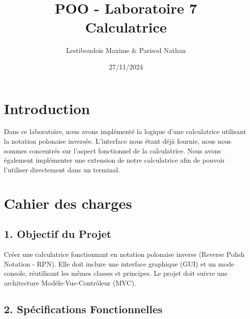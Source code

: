 \documentclass[12pt]{report}
\title{POO - Laboratoire 7 \\ \large Calculatrice}
\author{Lestiboudois Maxime \& Parisod Nathan}
\date{27/11/2024}
\begin{document}
    \maketitle
    \tableofcontents
    \newpage


    \section*{Introduction}
    Dans ce laboratoire, nous avons implémenté la logique d'une calculatrice utilisant la notation polonaise inversée.
    L'interface nous étant déjà fournie, nous nous sommes concentrés sur l'aspect fonctionnel de la calculatrice.
    \newline Nous avons également implémenter une extension de notre calculatrice afin de pouvoir l'utiliser directement
    dans un terminal.
    \section*{Cahier des charges}
        \subsection*{1. Objectif du Projet}
        Créer une calculatrice fonctionnant en notation polonaise inverse (Reverse Polish Notation - RPN). Elle doit inclure une interface graphique (GUI) et un mode console, réutilisant les mêmes classes et principes. Le projet doit suivre une architecture Modèle-Vue-Contrôleur (MVC).

        \subsection*{2. Spécifications Fonctionnelles}
\end{document}
